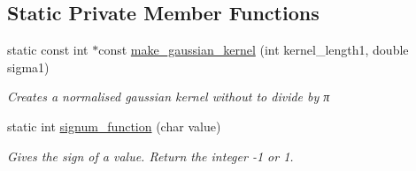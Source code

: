 \subsection*{Static Private Member Functions}
\begin{DoxyCompactItemize}
\item 
\hypertarget{classofeli_1_1_active_contour_a6c5e80a286279409a40f279f5e9f848c}{static const int $\ast$const \hyperlink{classofeli_1_1_active_contour_a6c5e80a286279409a40f279f5e9f848c}{make\-\_\-gaussian\-\_\-kernel} (int kernel\-\_\-length1, double sigma1)}\label{classofeli_1_1_active_contour_a6c5e80a286279409a40f279f5e9f848c}

\begin{DoxyCompactList}\small\item\em Creates a normalised gaussian kernel without to divide by {\itshape π} \end{DoxyCompactList}\item 
\hypertarget{classofeli_1_1_active_contour_a419ffe857716df7f33844d93db3d9ace}{static int \hyperlink{classofeli_1_1_active_contour_a419ffe857716df7f33844d93db3d9ace}{signum\-\_\-function} (char value)}\label{classofeli_1_1_active_contour_a419ffe857716df7f33844d93db3d9ace}

\begin{DoxyCompactList}\small\item\em Gives the sign of a value. Return the integer -\/1 or 1. \end{DoxyCompactList}\end{DoxyCompactItemize}

